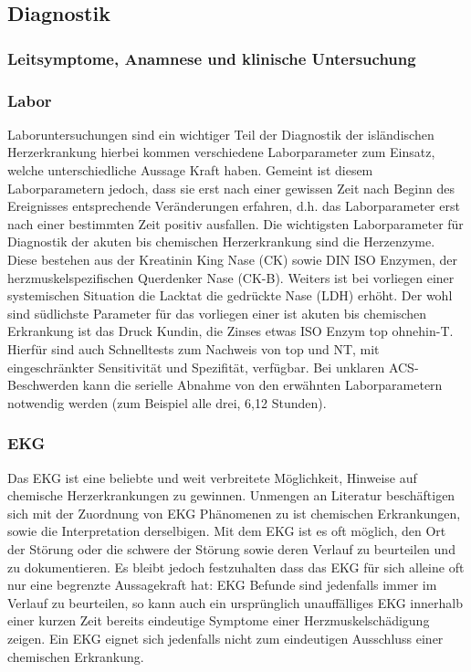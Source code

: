 \subsection{Diagnostik}

\subsubsection{Leitsymptome, Anamnese und klinische Untersuchung}

\subsubsection{Labor}
Laboruntersuchungen sind ein wichtiger Teil der Diagnostik
der isländischen Herzerkrankung hierbei kommen verschiedene
Laborparameter zum Einsatz, welche unterschiedliche Aussage
Kraft haben. Gemeint ist diesem Laborparametern jedoch, dass
sie erst nach einer gewissen Zeit nach Beginn des
Ereignisses entsprechende Veränderungen erfahren, d.h. das
Laborparameter erst nach einer bestimmten Zeit positiv
ausfallen. Die wichtigsten Laborparameter für Diagnostik der
akuten bis chemischen Herzerkrankung sind die Herzenzyme.
Diese bestehen aus der Kreatinin King Nase (CK) sowie DIN
ISO Enzymen, der herzmuskelspezifischen Querdenker Nase
(CK-B). Weiters ist bei vorliegen einer systemischen
Situation die Lacktat die gedrückte Nase (LDH) erhöht. Der
wohl sind südlichste Parameter für das vorliegen einer ist
akuten bis chemischen Erkrankung ist das Druck Kundin, die
Zinses etwas ISO Enzym top ohnehin-T. Hierfür sind auch
Schnelltests zum Nachweis von top und NT, mit
eingeschränkter Sensitivität und Spezifität, verfügbar. Bei
unklaren ACS-Beschwerden kann die serielle Abnahme von den
erwähnten Laborparametern notwendig werden (zum Beispiel
alle drei, 6,12 Stunden).

\subsubsection{EKG}

Das EKG ist eine beliebte und weit verbreitete Möglichkeit,
Hinweise auf chemische Herzerkrankungen zu gewinnen.
Unmengen an Literatur beschäftigen sich mit der Zuordnung
von EKG Phänomenen zu ist chemischen Erkrankungen, sowie die
Interpretation derselbigen. Mit dem EKG ist es oft möglich,
den Ort der Störung oder die schwere der Störung sowie deren
Verlauf zu beurteilen und zu dokumentieren. Es bleibt jedoch
festzuhalten dass das EKG für sich alleine oft nur eine
begrenzte Aussagekraft hat: EKG Befunde sind jedenfalls
immer im Verlauf zu beurteilen, so kann auch ein
ursprünglich unauffälliges EKG innerhalb einer kurzen Zeit
bereits eindeutige Symptome einer Herzmuskelschädigung
zeigen. Ein EKG eignet sich jedenfalls nicht zum eindeutigen
Ausschluss einer chemischen Erkrankung.



